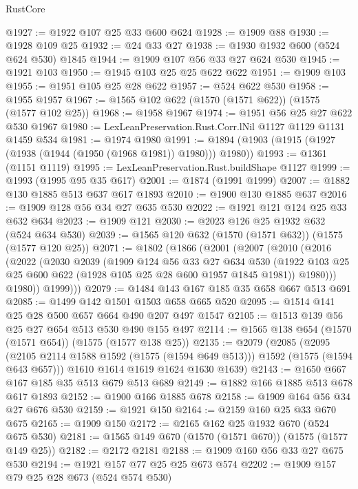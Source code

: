 \begin{lexlean}{RustCore}
\begin{coremodule}
@1927 := @1922 @107 @25 @33 @600 @624
@1928 := @1909 @88
@1930 := @1928 @109 @25
@1932 := @24 @33 @27
@1938 := @1930 @1932 @600 (@524 @624 @530) @1845
@1944 := @1909 @107 @56 @33 @27 @624 @530
@1945 := @1921 @103
@1950 := @1945 @103 @25 @25 @622 @622
@1951 := @1909 @103
@1955 := @1951 @105 @25 @28 @622
@1957 := @524 @622 @530
@1958 := @1955 @1957
@1967 := @1565 @102 @622 (@1570 (@1571 @622)) (@1575 (@1577 @102 @25))
@1968 := @1958 @1967
@1974 := @1951 @56 @25 @27 @622 @530 @1967
@1980 := LexLeanPreservation.Rust.Corr.lNil @1127 @1129 @1131 @1459 @534
@1981 := @1974 @1980
@1991 := @1894 (@1903 (@1915 (@1927 (@1938 (@1944 (@1950 (@1968 @1981)) @1980))) @1980))
@1993 := @1361 (@1151 @1119)
@1995 := LexLeanPreservation.Rust.buildShape @1127
@1999 := @1993 (@1995 @95 @35 @617)
@2001 := @1874 (@1991 @1999)
@2007 := @1882 @130 @1885 @513 @637 @617 @1893
@2010 := @1900 @130 @1885 @637
@2016 := @1909 @128 @56 @34 @27 @635 @530
@2022 := @1921 @121 @124 @25 @33 @632 @634
@2023 := @1909 @121
@2030 := @2023 @126 @25 @1932 @632 (@524 @634 @530)
@2039 := @1565 @120 @632 (@1570 (@1571 @632)) (@1575 (@1577 @120 @25))
@2071 := @1802
    (@1866
      (@2001
        (@2007
          (@2010
            (@2016
              (@2022
                (@2030
                  @2039
                  (@1909
                    @124
                    @56
                    @33
                    @27
                    @634
                    @530
                    (@1922 @103 @25 @25 @600 @622 (@1928 @105 @25 @28 @600 @1957 @1845 @1981))
                    @1980)))
              @1980))
          @1999)))
@2079 := @1484 @143 @167 @185 @35 @658 @667 @513 @691
@2085 := @1499 @142 @1501 @1503 @658 @665 @520
@2095 := @1514 @141 @25 @28 @500 @657 @664 @490 @207 @497 @1547
@2105 := @1513 @139 @56 @25 @27 @654 @513 @530 @490 @155 @497
@2114 := @1565 @138 @654 (@1570 (@1571 @654)) (@1575 (@1577 @138 @25))
@2135 := @2079
    (@2085
      (@2095 (@2105 @2114 @1588 @1592 (@1575 (@1594 @649 @513))) @1592 (@1575 (@1594 @643 @657)))
      @1610
      @1614
      @1619
      @1624
      @1630
      @1639)
@2143 := @1650 @667 @167 @185 @35 @513 @679 @513 @689
@2149 := @1882 @166 @1885 @513 @678 @617 @1893
@2152 := @1900 @166 @1885 @678
@2158 := @1909 @164 @56 @34 @27 @676 @530
@2159 := @1921 @150
@2164 := @2159 @160 @25 @33 @670 @675
@2165 := @1909 @150
@2172 := @2165 @162 @25 @1932 @670 (@524 @675 @530)
@2181 := @1565 @149 @670 (@1570 (@1571 @670)) (@1575 (@1577 @149 @25))
@2182 := @2172 @2181
@2188 := @1909 @160 @56 @33 @27 @675 @530
@2194 := @1921 @157 @77 @25 @25 @673 @574
@2202 := @1909 @157 @79 @25 @28 @673 (@524 @574 @530)

\end{coremodule}
\end{lexlean}
